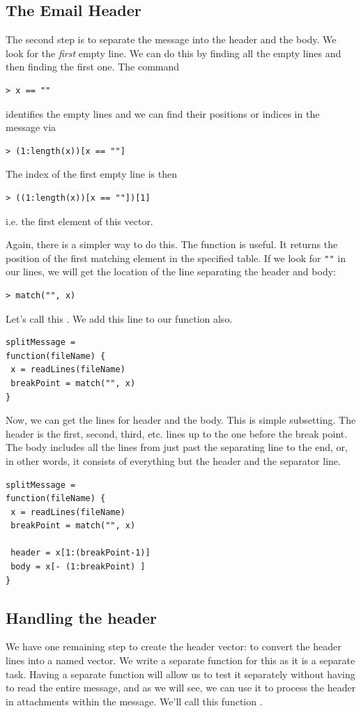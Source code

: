 \subsection{The Email Header}
The second step is to separate the message into the header and the body.
We look for the \textit{first} empty line.
We can do this by finding all the empty lines
and then finding the first one.
The command
\begin{verbatim}
> x == ""
\end{verbatim}
identifies the empty lines
and we can find their positions or indices in
the message via
\begin{verbatim}
> (1:length(x))[x == ""] 
\end{verbatim}
The index of the first empty line is then
\begin{verbatim}
> ((1:length(x))[x == ""])[1]
\end{verbatim}
i.e. the first element of this vector.

Again, there is a simpler way to do this.
The function  is useful.
It returns the position of the 
first matching element in the specified table.
If we look for \verb+""+ in our lines, we will
get the location of the line
separating the header and body:
\begin{verbatim}
> match("", x)
\end{verbatim}
Let's call this 
.
We add this line to our function also.

\begin{verbatim}
splitMessage =
function(fileName) {
 x = readLines(fileName)
 breakPoint = match("", x)
}
\end{verbatim}

Now, we can get the lines for header and the body.  This is simple
subsetting.  The header is the first, second, third, etc.  lines up to
the one before the break point.  The body includes all the lines
from just past the separating line to the end, or, in other words, it
consists of everything but the header and the separator line.

\begin{verbatim}
splitMessage =
function(fileName) {
 x = readLines(fileName)
 breakPoint = match("", x)

 header = x[1:(breakPoint-1)]
 body = x[- (1:breakPoint) ]
}
\end{verbatim}


\subsection{Handling the header}
We have one remaining step to create the header vector:  
to convert the header lines into a named vector.  
We write a separate function
for this as it is a separate task.  Having a separate function will
allow us to test it separately without having to read the entire
message, and as we will see, we can use it to process the header in
attachments within the message.  We'll call this function
.

